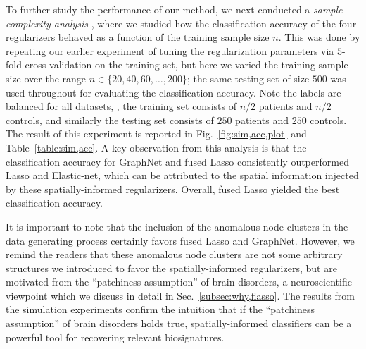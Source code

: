To further study the performance of our method, we next conducted a \emph{sample complexity analysis} \citep{Gramfort:2011}, where we studied how the classification accuracy of the four regularizers behaved as a function of the training sample size $n$.
This was done by repeating our earlier experiment of tuning the regularization parameters via $5$-fold cross-validation on the training set, but here we varied the training sample size over the range $n\in\{20,40,60,\dots,200\}$; the same testing set of size $500$ was used throughout for evaluating the classification accuracy.
Note the labels are balanced for all datasets, \ie, the training set consists of $n/2$ patients and $n/2$ controls, and similarly the testing set consists of $250$ patients and $250$ controls.
The result of this experiment is reported in Fig.~\ref{fig:sim,acc,plot} and Table~\ref{table:sim,acc}.
A key observation from this analysis is that the classification accuracy for GraphNet and fused Lasso consistently outperformed Lasso and Elastic-net, which can be attributed to the spatial information injected by these spatially-informed regularizers.
Overall, fused Lasso yielded the best classification accuracy.

It is important to note that the inclusion of the anomalous node clusters in the data generating process certainly favors fused Lasso and GraphNet.
However, we remind the readers that these anomalous node clusters are not some arbitrary structures we introduced to favor the spatially-informed regularizers, but are motivated from the ``patchiness assumption'' of brain disorders, a neuroscientific viewpoint which we discuss in detail in Sec.~\ref{subsec:why,flasso}.
The results from the simulation experiments confirm the intuition that if the ``patchiness assumption'' of brain disorders holds true, spatially-informed classifiers can be a powerful tool for recovering relevant biosignatures.

